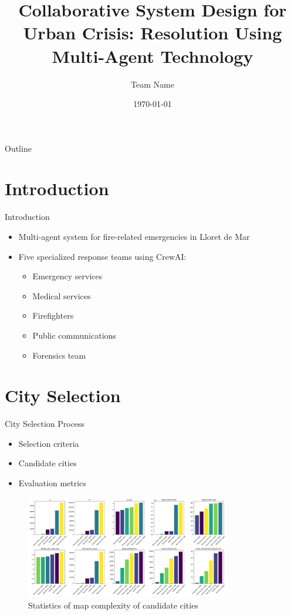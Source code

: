 \documentclass{beamer}
\title{Collaborative System Design for Urban Crisis: Resolution Using Multi-Agent Technology}
\author{Team Name}
\date{\today}
\begin{document}
\begin{frame}
    \titlepage
\end{frame}

\begin{frame}{Outline}
    \tableofcontents
\end{frame}

\section{Introduction}
\begin{frame}{Introduction}
    \begin{itemize}
        \item Multi-agent system for fire-related emergencies in Lloret de Mar
        \item Five specialized response teams using CrewAI:
        \begin{itemize}
            \item Emergency services
            \item Medical services
            \item Firefighters
            \item Public communications
            \item Forensics team
        \end{itemize}
    \end{itemize}
\end{frame}

\section{City Selection}
\begin{frame}{City Selection Process}
    \begin{itemize}
        \item Selection criteria
        \item Candidate cities
        \item Evaluation metrics
    \end{itemize}
    \begin{figure}[H]
        \centering
        \includegraphics[width=0.8\textwidth]{../figures/map_complexity_statistics.png}
        \caption{Statistics of map complexity of candidate cities}
    \end{figure}
\end{frame}
\end{document}
